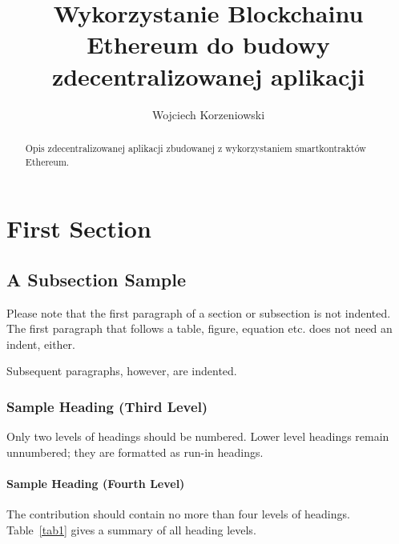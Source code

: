 \documentclass[runningheads]{llncs}
\begin{document}
\title{Wykorzystanie Blockchainu Ethereum do budowy zdecentralizowanej aplikacji}
\author{Wojciech Korzeniowski}

\maketitle

\begin{abstract}

  Opis zdecentralizowanej aplikacji zbudowanej z wykorzystaniem smartkontraktów
  Ethereum.

\end{abstract}

\section{First Section}
\subsection{A Subsection Sample}
Please note that the first paragraph of a section or subsection is
not indented. The first paragraph that follows a table, figure,
equation etc. does not need an indent, either.

Subsequent paragraphs, however, are indented.

\subsubsection{Sample Heading (Third Level)} Only two levels of
headings should be numbered. Lower level headings remain unnumbered;
they are formatted as run-in headings.

\paragraph{Sample Heading (Fourth Level)}
The contribution should contain no more than four levels of
headings. Table~\ref{tab1} gives a summary of all heading levels.
\end{document}
